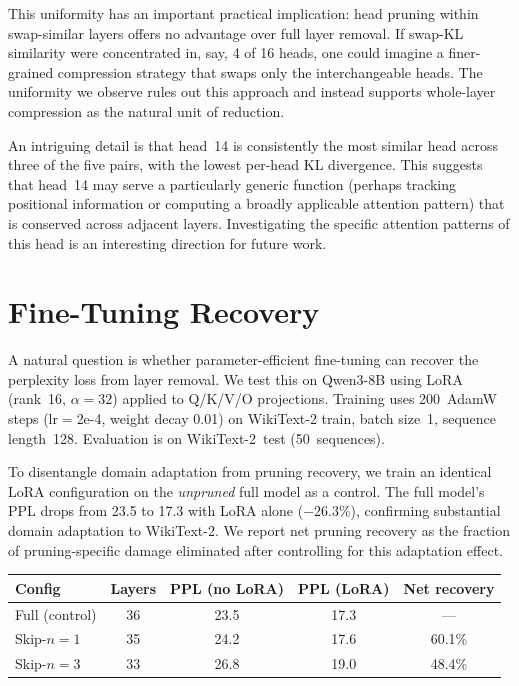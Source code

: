 \documentclass{article}
\newenvironment{tabhere}{%
  \par\medskip
  \begin{center}
}{%
  \end{center}
  \medskip
}
\begin{document}
This uniformity has an important practical implication: head pruning within swap-similar layers offers no advantage over full layer removal. If swap-KL similarity were concentrated in, say, 4 of 16 heads, one could imagine a finer-grained compression strategy that swaps only the interchangeable heads. The uniformity we observe rules out this approach and instead supports whole-layer compression as the natural unit of reduction.

An intriguing detail is that head~14 is consistently the most similar head across three of the five pairs, with the lowest per-head KL divergence. This suggests that head~14 may serve a particularly generic function (perhaps tracking positional information or computing a broadly applicable attention pattern) that is conserved across adjacent layers. Investigating the specific attention patterns of this head is an interesting direction for future work.

\section{Fine-Tuning Recovery}
\label{sec:exp_finetune}
\label{sec:app_finetune}

A natural question is whether parameter-efficient fine-tuning can recover the perplexity loss from layer removal.
We test this on Qwen3-8B using LoRA~\citep{hu2022lora} (rank~16, $\alpha{=}32$) applied to Q/K/V/O projections.
Training uses 200~AdamW steps (lr$=$2e-4, weight decay 0.01) on WikiText-2 train, batch size~1, sequence length~128.
Evaluation is on WikiText-2~test (50~sequences).

To disentangle domain adaptation from pruning recovery, we train an identical LoRA configuration on the \emph{unpruned} full model as a control.
The full model's PPL drops from 23.5 to 17.3 with LoRA alone ($-$26.3\%), confirming substantial domain adaptation to WikiText-2.
We report net pruning recovery as the fraction of pruning-specific damage eliminated after controlling for this adaptation effect.

\begin{tabhere}
\begin{tabular}{lcccc}
\toprule
Config & Layers & PPL (no LoRA) & PPL (LoRA) & Net recovery \\
\midrule
Full (control)          & 36 & 23.5 & 17.3 & --- \\
Skip-$n{=}1$ & 35 & 24.2 & 17.6 & 60.1\% \\
Skip-$n{=}3$ & 33 & 26.8 & 19.0 & 48.4\% \\
\bottomrule
\end{tabular}
\label{tab:lora_recovery}
\end{tabhere}
\end{document}
